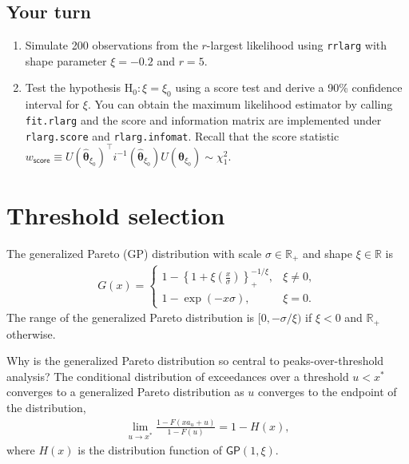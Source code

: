 \documentclass[]{book}
\providecommand{\tightlist}{%
  \setlength{\itemsep}{0pt}\setlength{\parskip}{0pt}}
\begin{document}
\hypertarget{your-turn}{%
\section{Your turn}\label{your-turn}}

\begin{enumerate}
\def\labelenumi{\arabic{enumi}.}
\tightlist
\item
  Simulate 200 observations from the \(r\)-largest likelihood using \texttt{rrlarg} with shape parameter \(\xi=-0.2\) and \(r=5\).
\item
  Test the hypothesis \(\mathrm{H}_0: \xi = \xi_0\) using a score test and derive a 90\% confidence interval for \(\xi\). You can obtain the maximum likelihood estimator by calling \texttt{fit.rlarg} and the score and information matrix are implemented under \texttt{rlarg.score} and \texttt{rlarg.infomat}. Recall that the score statistic \(w_{\mathsf{score}} \equiv U(\hat{\boldsymbol{\theta}}_{\xi_0})^\top i^{-1}(\hat{\boldsymbol{\theta}}_{\xi_0})U( \hat{\boldsymbol{\theta}}_{\xi_0}) \sim \chi^2_1.\)
\end{enumerate}

\hypertarget{threshold-selection}{%
\chapter{Threshold selection}\label{threshold-selection}}

The generalized Pareto (GP) distribution with scale \(\sigma \in \mathbb{R}_{+}\) and shape \(\xi \in \mathbb{R}\) is
\begin{align*}
  G(x)  = \begin{cases}
1-\left\{1+\xi \left(\frac{x}{\sigma}\right)\right\}_{+}^{-1/\xi}, &  \xi \neq 0,
\\ 1-\exp \left(-{x}{\sigma}\right),&  \xi = 0.
\end{cases}
 \end{align*}
The range of the generalized Pareto distribution is \([0, -\sigma/\xi)\) if \(\xi < 0\) and \(\mathbb{R}_{+}\) otherwise.

Why is the generalized Pareto distribution so central to peaks-over-threshold analysis? The conditional distribution of exceedances over a threshold \(u < x^*\) converges to a generalized Pareto distribution as \(u\) converges to the endpoint of the distribution,
\begin{align*}
\lim_{u \to x^*} \frac{1-F(xa_u+u)}{1-F(u)} = 1-H(x),
\end{align*}
where \(H(x)\) is the distribution function of \(\mathsf{GP}(1, \xi)\).
\end{document}
